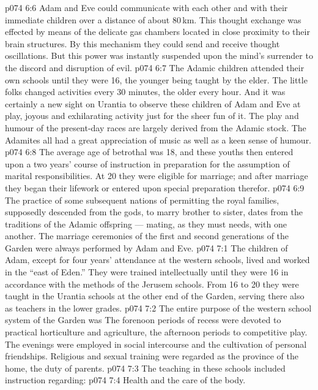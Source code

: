 \vs p074 6:6 Adam and Eve could communicate with each other and with their immediate children over a distance of about 80\,km. This thought exchange was effected by means of the delicate gas chambers located in close proximity to their brain structures. By this mechanism they could send and receive thought oscillations. But this power was instantly suspended upon the mind’s surrender to the discord and disruption of evil.
\vs p074 6:7 \pc The Adamic children attended their own schools until they were 16, the younger being taught by the elder. The little folks changed activities every 30 minutes, the older every hour. And it was certainly a new sight on Urantia to observe these children of Adam and Eve at play, joyous and exhilarating activity just for the sheer fun of it. The play and humour of the present\hyp{}day races are largely derived from the Adamic stock. The Adamites all had a great appreciation of music as well as a keen sense of humour.
\vs p074 6:8 The average age of betrothal was 18, and these youths then entered upon a two years’ course of instruction in preparation for the assumption of marital responsibilities. At 20 they were eligible for marriage; and after marriage they began their lifework or entered upon special preparation therefor.
\vs p074 6:9 The practice of some subsequent nations of permitting the royal families, supposedly descended from the gods, to marry brother to sister, dates from the traditions of the Adamic offspring --- mating, as they must needs, with one another. The marriage ceremonies of the first and second generations of the Garden were always performed by Adam and Eve.
\vs p074 7:1 The children of Adam, except for four years’ attendance at the western schools, lived and worked in the “east of Eden.” They were trained intellectually until they were 16 in accordance with the methods of the Jerusem schools. From 16 to 20 they were taught in the Urantia schools at the other end of the Garden, serving there also as teachers in the lower grades.
\vs p074 7:2 The entire purpose of the western school system of the Garden was  The forenoon periods of recess were devoted to practical horticulture and agriculture, the afternoon periods to competitive play. The evenings were employed in social intercourse and the cultivation of personal friendships. Religious and sexual training were regarded as the province of the home, the duty of parents.
\vs p074 7:3 The teaching in these schools included instruction regarding:
\vs p074 7:4 \bibnobreakspace Health and the care of the body.
